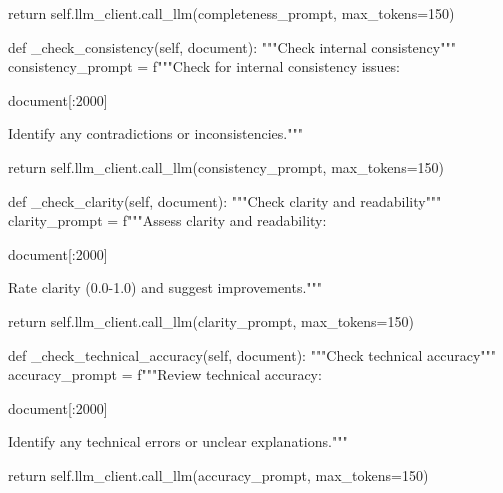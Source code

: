         return self.llm_client.call_llm(completeness_prompt, max_tokens=150)
    
    def _check_consistency(self, document):
        """Check internal consistency"""
        consistency_prompt = f"""Check for internal consistency issues:

{document[:2000]}

Identify any contradictions or inconsistencies."""
        
        return self.llm_client.call_llm(consistency_prompt, max_tokens=150)
    
    def _check_clarity(self, document):
        """Check clarity and readability"""
        clarity_prompt = f"""Assess clarity and readability:

{document[:2000]}

Rate clarity (0.0-1.0) and suggest improvements."""
        
        return self.llm_client.call_llm(clarity_prompt, max_tokens=150)
    
    def _check_technical_accuracy(self, document):
        """Check technical accuracy"""
        accuracy_prompt = f"""Review technical accuracy:

{document[:2000]}

Identify any technical errors or unclear explanations."""
        
        return self.llm_client.call_llm(accuracy_prompt, max_tokens=150)